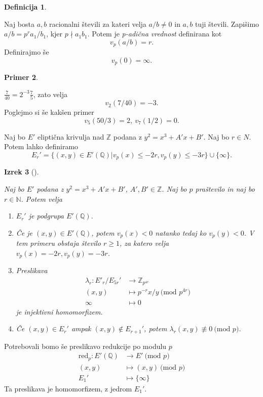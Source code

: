 \documentclass[12pt,a4paper,twoside]{article}
\theoremstyle{definition} %
\newtheorem{definicija}{Definicija}[section]
\newtheorem{primer}[definicija]{Primer}
\theoremstyle{plain} %
\newtheorem{izrek}[definicija]{Izrek}
\numberwithin{equation}{section}  %
\newcommand{\N}{\mathbb N}
\newcommand{\Z}{\mathbb Z}
\newcommand{\Q}{\mathbb Q}
\newcommand{\MOD}[1]{\ \text{(mod }{#1}\text{)}}
\begin{document}
\begin{definicija}~

Naj bosta $a,b$ racionalni števili za kateri velja $a/b \neq 0$ in $a,b$ tuji števili. Zapišimo $a/b = p^ra_1/b_1$, kjer $p \nmid a_1b_1$. Potem je \emph{p-adična vrednost} definirana
kot
$$v_p(a/b) = r.$$
Definirajmo še
$$v_p(0) = \infty.$$
\end{definicija}

\begin{primer}~

$\frac{7}{40} = 2^{-3}\frac{7}{5}$, zato velja
$$v_2(7/40) = -3.$$
Poglejmo si še kakšen primer
$$v_5(50/3) = 2,\ v_7(1/2) = 0.$$
\end{primer}

Naj bo $E'$ eliptična krivulja nad $\Z$ podana z $y^2 = x^3+A'x+B'$. Naj bo $r \in N$. Potem lahko definiramo
$$E_r' = \{  (x,y) \in E'(\Q) | v_p(x) \leq -2r, v_p(y) \leq -3r \} \cup \{ \infty \}.$$

\begin{izrek}[]~

Naj bo $E'$ podana z $y^2 = x^3+A'x+B'$, $A',B' \in \Z$. Naj bo $p$ praštevilo in naj bo $r \in \N$. Potem velja
\begin{enumerate}

\item $E_r'$ je podgrupa $E'(\Q)$.
\item Če je $(x,y) \in E'(\Q)$, potem $v_p(x)<0$ natanko tedaj ko $v_p(y) <0$. V tem primeru obstaja število $r \geq 1$, za katero velja $v_p(x) = -2r, v_p(y) = -3r$.
\item Preslikava
\begin{align}
\lambda_r: E'_r/E_{5r}' &{}\rightarrow \Z_{p^{4r}} \nonumber \\
(x,y) &{}\mapsto p^{-r}x/y \MOD{p^{4r}} \nonumber \\
\infty &{}\mapsto 0 \nonumber
\end{align}
je injektivni homomorfizem.
\item Če $(x,y) \in E_r'$ ampak $(x,y) \not \in E_{r+1}'$, potem $\lambda_r(x,y) \not \equiv 0 \MOD{p}$.

\end{enumerate}
\end{izrek}

Potrebovali bomo še preslikavo redukcije po modulu $p$
\begin{align}
\text{red}_p: E'(\Q) &{}\rightarrow E' \MOD{p} \nonumber \\
(x,y) &{}\mapsto (x,y) \MOD{p} \nonumber \\
E_1' &{}\mapsto \{ \infty \} \nonumber
\end{align}
Ta preslikava je homomorfizem, z jedrom $E_1'$.
\end{document}
